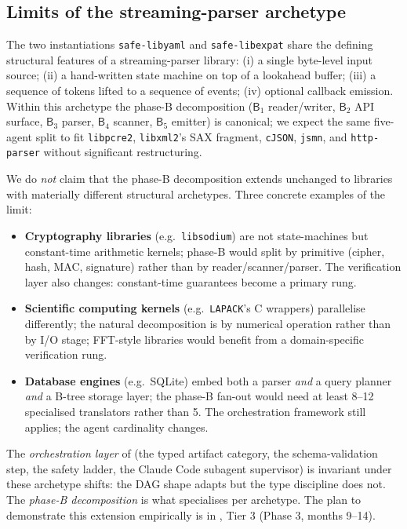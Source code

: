 \documentclass[12pt]{article}
\theoremstyle{definition}
\theoremstyle{remark}
\newcommand{\safelibyaml}{\texttt{safe-libyaml}}
\newcommand{\safelibexpat}{\texttt{safe-libexpat}}
\newcommand{\Agent}[1]{\ensuremath{\mathsf{#1}}}
\begin{document}
\subsection{Limits of the streaming-parser archetype}
\label{sec:libexpat-limits}

The two instantiations \safelibyaml{} and \safelibexpat{} share the
defining structural features of a streaming-parser library:
(i) a single byte-level input source; (ii) a hand-written state machine
on top of a lookahead buffer; (iii) a sequence of tokens lifted to a
sequence of events; (iv) optional callback emission. Within this
archetype the phase-B decomposition (\(\Agent{B}_1\) reader/writer,
\(\Agent{B}_2\) API surface, \(\Agent{B}_3\) parser, \(\Agent{B}_4\)
scanner, \(\Agent{B}_5\) emitter) is canonical; we expect the same
five-agent split to fit \texttt{libpcre2}, \texttt{libxml2}'s SAX
fragment, \texttt{cJSON}, \texttt{jsmn}, and \texttt{http-parser}
without significant restructuring.

We do \emph{not} claim that the phase-B decomposition extends
unchanged to libraries with materially different structural archetypes.
Three concrete examples of the limit:

\begin{itemize}
\item \textbf{Cryptography libraries} (e.g.\ \texttt{libsodium}) are
  not state-machines but constant-time arithmetic kernels; phase-B
  would split by primitive (cipher, hash, MAC, signature) rather than
  by reader/scanner/parser. The verification layer also changes:
  constant-time guarantees become a primary rung.
\item \textbf{Scientific computing kernels} (e.g.\ \texttt{LAPACK}'s
  C wrappers) parallelise differently; the natural decomposition is by
  numerical operation rather than by I/O stage; FFT-style libraries
  would benefit from a domain-specific verification rung.
\item \textbf{Database engines} (e.g.\ SQLite) embed both a parser
  \emph{and} a query planner \emph{and} a B-tree storage layer; the
  phase-B fan-out would need at least 8--12 specialised translators
  rather than 5. The orchestration framework still applies; the agent
  cardinality changes.
\end{itemize}

The \emph{orchestration layer} of  (the typed
artifact category, the schema-validation step, the safety ladder, the
Claude Code subagent supervisor) is invariant under these archetype shifts: the DAG
shape adapts but the type discipline does not. The
\emph{phase-B decomposition} is what specialises per archetype. The
plan to demonstrate this extension empirically is in
\cite{ferroustargets2026}, Tier 3 (Phase 3, months 9--14).
\end{document}
